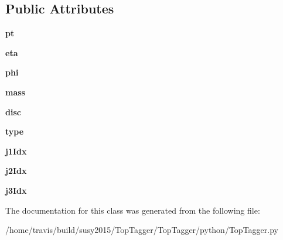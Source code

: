\subsection*{Public Attributes}
\begin{DoxyCompactItemize}
\item 
\hypertarget{classTopTagger_1_1Top_a1eab0b54181fd0ea574e57b35ccc59e1}{{\bfseries pt}}\label{classTopTagger_1_1Top_a1eab0b54181fd0ea574e57b35ccc59e1}

\item 
\hypertarget{classTopTagger_1_1Top_a42895f21679a2a03ea4e320a9219b682}{{\bfseries eta}}\label{classTopTagger_1_1Top_a42895f21679a2a03ea4e320a9219b682}

\item 
\hypertarget{classTopTagger_1_1Top_af5ec16e9139fc919b6cca9f222915993}{{\bfseries phi}}\label{classTopTagger_1_1Top_af5ec16e9139fc919b6cca9f222915993}

\item 
\hypertarget{classTopTagger_1_1Top_a2a8d1553340a83f07989044d903813b2}{{\bfseries mass}}\label{classTopTagger_1_1Top_a2a8d1553340a83f07989044d903813b2}

\item 
\hypertarget{classTopTagger_1_1Top_a361f8b14fe698a10a815504bf554b5f9}{{\bfseries disc}}\label{classTopTagger_1_1Top_a361f8b14fe698a10a815504bf554b5f9}

\item 
\hypertarget{classTopTagger_1_1Top_a3da1fcb0f8ea21d672a105e30a03d496}{{\bfseries type}}\label{classTopTagger_1_1Top_a3da1fcb0f8ea21d672a105e30a03d496}

\item 
\hypertarget{classTopTagger_1_1Top_aebc3fb5ff67de0560cf769c4555de3b0}{{\bfseries j1\-Idx}}\label{classTopTagger_1_1Top_aebc3fb5ff67de0560cf769c4555de3b0}

\item 
\hypertarget{classTopTagger_1_1Top_a5543e5f414244684d33b9d0861013538}{{\bfseries j2\-Idx}}\label{classTopTagger_1_1Top_a5543e5f414244684d33b9d0861013538}

\item 
\hypertarget{classTopTagger_1_1Top_a71bca621aa593a25d15273386bda4cd0}{{\bfseries j3\-Idx}}\label{classTopTagger_1_1Top_a71bca621aa593a25d15273386bda4cd0}

\end{DoxyCompactItemize}


The documentation for this class was generated from the following file\-:\begin{DoxyCompactItemize}
\item 
/home/travis/build/susy2015/\-Top\-Tagger/\-Top\-Tagger/python/Top\-Tagger.\-py\end{DoxyCompactItemize}
